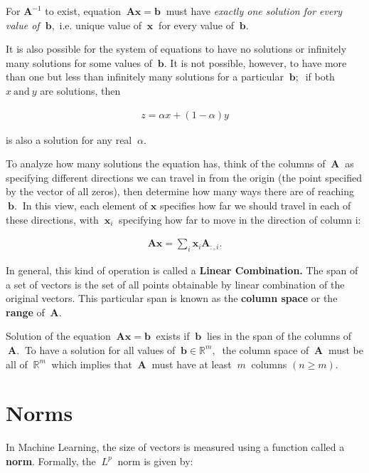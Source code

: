 \documentclass[12pt]{article}
\begin{document}
For $\mathbf{A}^{-1}$ to exist, equation $\ \mathbf{A}\mathbf{x}=\mathbf{b}\ $ must have \textit{exactly one solution for every value of $\ \mathbf{b},$} i.e. unique value of $\ \mathbf{x}\ $ for every value of $\ \mathbf{b}.$

It is also possible for the system of equations to have no solutions or infinitely many solutions for some values of $\ \mathbf{b}.$ It is not possible, however, to have more than one but less than infinitely many solutions for a particular $\ \mathbf{b};\ $ if both $x\ \text{and}\ y$ are solutions, then

\begin{align}
z = \alpha{x} + (1 −\alpha){y}
\end{align}

is also a solution for any real $\ \alpha.$

To analyze how many solutions the equation has, think of the columns of $\ \mathbf{A}\ $ as specifying different directions we can travel in from the origin (the point specified by the vector of all zeros), then determine how many ways there are of reaching $\ \mathbf{b}.\ $ In this view, each element of $\mathbf{x}$ specifies how far we should travel in each of these directions, with $\ \mathbf{x}_{i}\ $ specifying how far to move in the direction of column i:

\begin{align}
\mathbf{A}\mathbf{x}=\sum _{i}\mathbf{x}_{i}\mathbf{A}_{:,i}.
\end{align}

In general, this kind of operation is called a \textbf{Linear Combination.} The span of a set of vectors is the set of all points obtainable by linear combination of the original vectors. This particular span is known as the \textbf{column space} or the \textbf{range} of $\ \mathbf{A}.$

Solution of the equation $\ \mathbf{A}\mathbf{x}=\mathbf{b}\ $ exists if $\ \mathbf{b}\ $ lies in the span of the columns of $\ \mathbf{A}.\ $ To have a solution for all values of $\ \mathbf{b}\in\mathbb{R}^{m},\ $ the column space of $\ \mathbf{A}\ $ must be all of $\ \mathbb{R}^{m}\ $ which implies that $\ \mathbf{A}\ $ must have at least $\ m\ $ columns $(n\geq m)$.

\section{Norms}

In Machine Learning, the size of vectors is measured using a function called a \textbf{norm}. Formally, the $\ L^{p}\ $ norm is given by:
\end{document}
